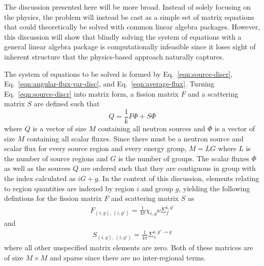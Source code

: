 The discussion presented here will be more broad. Instead of solely focusing on the physics, the problem will instead be cast as a simple set of matrix equations that could theoretically be solved with common linear algebra packages. However, this discussion will show that blindly solving the system of equations with a general linear algebra package is computationally infeasible since it loses sight of inherent structure that the physics-based approach naturally captures.

The system of equations to be solved is formed by Eq.~\ref{eqn:source-discr}, Eq.~\ref{eqn:angular-flux-var-disc}, and Eq.~\ref{eqn:average-flux}. Turning Eq.~\ref{eqn:source-discr} into matrix form, a fission matrix $F$ and a scattering matrix $S$ are defined such that
\begin{equation}
Q = \frac{1}{k} F \Phi + S \Phi
\label{eqn:matrix-source-calc}
\end{equation}
where $Q$ is a vector of size $M$ containing all neutron sources and $\Phi$ is a vector of size $M$ containing all scalar fluxes. Since there must be a neutron source and scalar flux for every source region and every energy group, $M = L G$ where $L$ is the number of source regions and $G$ is the number of groups. The scalar fluxes $\Phi$ as well as the sources $Q$ are ordered such that they are contiguous in group with the index calculated as $i G + g$. In the context of this discussion, elements relating to region quantities are indexed by region $i$ and group $g$, yielding the following defintions for the fission matrix $F$ and scattering matrix $S$ as
\begin{eqnarray}
F_{\left(i, g\right), \, \left(i, g'\right)} = \frac{1}{4\pi} \chi_{i,g} \nu \Sigma_f^{i,g'}
\end{eqnarray}
and
\begin{eqnarray}
S_{\left(i, g\right), \, \left(i, g'\right)} = \frac{1}{4\pi} \Sigma_s^{i,g' \rightarrow g}
\end{eqnarray}
where all other unspecified matrix elements are zero. Both of these matrices are of size $M \times M$ and sparse since there are no inter-regional terms.

